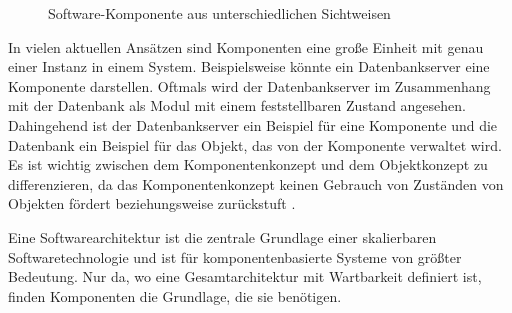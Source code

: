 \begin{figure}[h]
  \centering
  \qquad
  \caption[
    Software-Komponente aus unterschiedlichen Sichtweisen
  ]{
    Software-Komponente aus unterschiedlichen Sichtweisen
  }
  \label{fig:Komponente_Sichtweise}
\end{figure}

In vielen aktuellen Ansätzen sind Komponenten eine große Einheit mit genau einer Instanz in einem System. Beispielsweise könnte ein Datenbankserver eine Komponente darstellen. Oftmals wird der Datenbankserver im Zusammenhang mit der Datenbank als Modul mit einem feststellbaren Zustand angesehen. Dahingehend ist der Datenbankserver ein Beispiel für eine Komponente und die Datenbank ein Beispiel für das Objekt, das von der Komponente verwaltet wird. Es ist wichtig zwischen dem Komponentenkonzept und dem Objektkonzept zu differenzieren, da das Komponentenkonzept keinen Gebrauch von Zuständen von Objekten fördert beziehungsweise zurückstuft \citereset \autocite[siehe][S. 35-38]{Szyperski.2002}.

Eine Softwarearchitektur ist die zentrale Grundlage einer skalierbaren Softwaretechnologie und ist für komponentenbasierte Systeme von größter Bedeutung. Nur da, wo eine Gesamtarchitektur mit Wartbarkeit definiert ist, finden Komponenten die Grundlage, die sie benötigen.